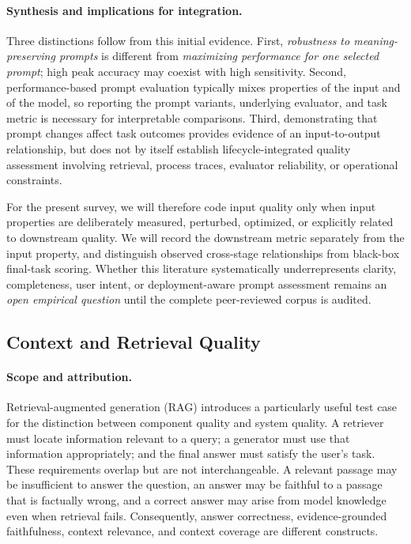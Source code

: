 \paragraph{Synthesis and implications for integration.}
Three distinctions follow from this initial evidence. First, \emph{robustness to meaning-preserving prompts} is different from \emph{maximizing performance for one selected prompt}; high peak accuracy may coexist with high sensitivity. Second, performance-based prompt evaluation typically mixes properties of the input and of the model, so reporting the prompt variants, underlying evaluator, and task metric is necessary for interpretable comparisons. Third, demonstrating that prompt changes affect task outcomes provides evidence of an input-to-output relationship, but does not by itself establish lifecycle-integrated quality assessment involving retrieval, process traces, evaluator reliability, or operational constraints.

For the present survey, we will therefore code input quality only when input properties are deliberately measured, perturbed, optimized, or explicitly related to downstream quality. We will record the downstream metric separately from the input property, and distinguish observed cross-stage relationships from black-box final-task scoring. Whether this literature systematically underrepresents clarity, completeness, user intent, or deployment-aware prompt assessment remains an \emph{open empirical question} until the complete peer-reviewed corpus is audited.

\subsection{Context and Retrieval Quality}
\label{sec:context-quality}

\paragraph{Scope and attribution.}
Retrieval-augmented generation (RAG) introduces a particularly useful test case for the distinction between component quality and system quality. A retriever must locate information relevant to a query; a generator must use that information appropriately; and the final answer must satisfy the user's task. These requirements overlap but are not interchangeable. A relevant passage may be insufficient to answer the question, an answer may be faithful to a passage that is factually wrong, and a correct answer may arise from model knowledge even when retrieval fails. Consequently, answer correctness, evidence-grounded faithfulness, context relevance, and context coverage are different constructs.


